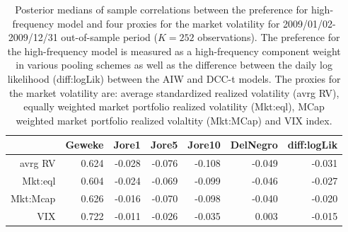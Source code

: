 \begin{table}[ht]
\centering
\caption{Posterior medians of sample correlations 
             between the preference for high-frequency
             model  and four proxies for the   market volatility for 
             2009/01/02-2009/12/31 out-of-sample period ($K=252$ observations).
             The preference for the high-frequency model is measured as a 
             high-frequency 
             component weight in various  pooling schemes 
             as well as the difference between the daily log likelihood (diff:logLik) 
             between the AIW and DCC-t models.
             The proxies for the market volatility are: average standardized 
             realized volatility (avrg RV), 
             equally weighted market portfolio realized volatility (Mkt:eql), 
             MCap weighted market portfolio realized volaltity (Mkt:MCap) 
             and VIX index.} 
\label{table:corrs}
\begin{tabular}{rrrrrrr}
  \hline
 & Geweke & Jore1 & Jore5 & Jore10 & DelNegro & diff:logLik \\ 
  \hline
avrg RV & 0.624 & -0.028 & -0.076 & -0.108 & -0.049 & -0.031 \\ 
  Mkt:eql & 0.604 & -0.024 & -0.069 & -0.099 & -0.046 & -0.027 \\ 
  Mkt:Mcap & 0.626 & -0.016 & -0.070 & -0.098 & -0.040 & -0.020 \\ 
  VIX & 0.722 & -0.011 & -0.026 & -0.035 & 0.003 & -0.015 \\ 
   \hline
\end{tabular}
\end{table}

